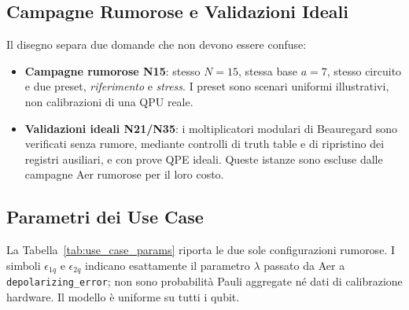\begin{onehalfspace}
\section{Campagne Rumorose e Validazioni Ideali}
\label{sec:use_case}

Il disegno separa due domande che non devono essere confuse:

\begin{itemize}
    \item \textbf{Campagne rumorose N15}: stesso $N=15$, stessa base $a=7$, stesso circuito e due preset, \emph{riferimento} e \emph{stress}. I preset sono scenari uniformi illustrativi, non calibrazioni di una QPU reale.

    \item \textbf{Validazioni ideali N21/N35}: i moltiplicatori modulari di Beauregard sono verificati senza rumore, mediante controlli di truth table e di ripristino dei registri ausiliari, e con prove QPE ideali. Queste istanze sono escluse dalle campagne Aer rumorose per il loro costo.
\end{itemize}

\subsection{Parametri dei Use Case}

La Tabella~\ref{tab:use_case_params} riporta le due sole configurazioni rumorose. I simboli $\epsilon_{1q}$ e $\epsilon_{2q}$ indicano esattamente il parametro $\lambda$ passato da Aer a \texttt{depolarizing\_error}; non sono probabilità Pauli aggregate né dati di calibrazione hardware. Il modello è uniforme su tutti i qubit.

\begin{table}[H]
\centering
{}
\caption{Preset uniformi illustrativi per le campagne rumorose N15. Non rappresentano la calibrazione di una QPU reale.}
\label{tab:use_case_params}
\end{table}


\end{onehalfspace}
